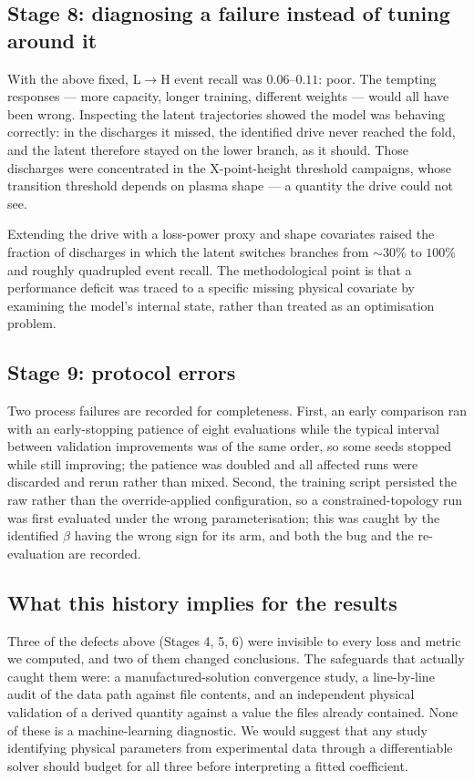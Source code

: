 \subsection{Stage 8: diagnosing a failure instead of tuning around it}
\label{app:hist-covariates}

With the above fixed, L$\to$H event recall was $0.06$--$0.11$: poor. The
tempting responses --- more capacity, longer training, different weights ---
would all have been wrong. Inspecting the latent trajectories showed the
model was behaving correctly: in the discharges it missed, the identified
drive never reached the fold, and the latent therefore stayed on the lower
branch, as it should. Those discharges were concentrated in the X-point-height
threshold campaigns, whose transition threshold depends on plasma shape ---
a quantity the drive could not see.

Extending the drive with a loss-power proxy and shape covariates raised the
fraction of discharges in which the latent switches branches from $\sim$$30\%$
to $100\%$ and roughly quadrupled event recall. The methodological point is
that a performance deficit was traced to a specific missing physical
covariate by examining the model's internal state, rather than treated as an
optimisation problem.

\subsection{Stage 9: protocol errors}
\label{app:hist-protocol}

Two process failures are recorded for completeness. First, an early
comparison ran with an early-stopping patience of eight evaluations while
the typical interval between validation improvements was of the same order,
so some seeds stopped while still improving; the patience was doubled and
all affected runs were discarded and rerun rather than mixed. Second, the
training script persisted the raw rather than the override-applied
configuration, so a constrained-topology run was first evaluated under the
wrong parameterisation; this was caught by the identified $\beta$ having the
wrong sign for its arm, and both the bug and the re-evaluation are recorded.

\subsection{What this history implies for the results}
\label{app:hist-implications}

Three of the defects above (Stages 4, 5, 6) were invisible to every loss and
metric we computed, and two of them changed conclusions. The safeguards that
actually caught them were: a manufactured-solution convergence study, a
line-by-line audit of the data path against file contents, and an
independent physical validation of a derived quantity against a value the
files already contained. None of these is a machine-learning diagnostic. We
would suggest that any study identifying physical parameters from
experimental data through a differentiable solver should budget for all
three before interpreting a fitted coefficient.
